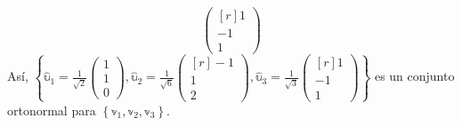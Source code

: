 \begin{example}
$$\begin{pmatrix*}[r]
        1 \\
        -1 \\
        1
    \end{pmatrix*}$$
    Así, $\displaystyle \left\{ \hat{\mathbb{u}}_1 = \frac{1}{\sqrt{2}} \begin{pmatrix}
        1 \\
        1 \\
        0
    \end{pmatrix}, \hat{\mathbb{u}}_2 = \frac{1}{\sqrt{6}} \begin{pmatrix*}[r]
        -1 \\
        1 \\
        2
    \end{pmatrix*}, \hat{\mathbb{u}}_3 = \frac{1}{\sqrt{3}} \begin{pmatrix*}[r]
        1 \\
        -1 \\
        1
    \end{pmatrix*} \right\}$ es un conjunto ortonormal para $\left\{ \mathbb{v}_1, \mathbb{v}_2, \mathbb{v}_3 \right\}$.
\end{example}

